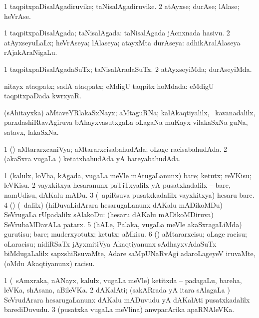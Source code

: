 \bentry
{}
\gl{\nA}
\bmng
\bnum
\num{1} taqpitxpaDisalAgadiruvike; taNisalAgadiruvike. 
\num{2} atAyxse; durAse; lAlase; heVrAse. 
\enum
\emng
\eentry

\bentry
{}
\gl{\gu}
\bmng
\bnum
\num{1} taqpitxpaDisalAgada; taNisalAgada:  taNisalAgada jAcnxnada hasivu. 
\num{2} atAyxseyuLaLx; heVrAseya; lAlaseya; atayxMta durAseya:  adhikAralAlaseya rAjakAraNigaLu. 
\enum
\emng
\eentry

\bentry
{}
\gl{\kirxvi}
\bmng
\bnum
\num{1} taqpitxpaDisalAgadaSuTx; taNisalAradaSuTx. 
\num{2} atAyxseyiMda; durAseyiMda. 
\enum
\emng
\eentry

\bentry
{}
\gl{\gu}
\bmng
nitayx ataqpatx; sadA ataqpatx; eMdigU taqpitx hoMdada:  eMdigU taqpitxpaDada kwrxyaR. 
\emng
\eentry

\bentry
{}
\gl{\nA}
\bmng
(sAhitayxka) aMtaveYRlakaSxNayx; aMtaguRNa; kalAkaqtiyalilx, \kanmu\ kavanadalilx, parxdashiRtavAgiruva bAhayxvasutxgaLa oLagaNa muKayx vilakaSxNa guNa, satavx, lakaSxNa. 
\emng
\eentry

\bentry
{}
\gl{\gu}
\bmng
\bnum
\num{1} (\jAyx) aMtararxcaniVya; aMtararxcisabahudAda; oLage racisabahudAda. 
\num{2} (akaSxra \mo vugaLa \vi) ketatxbahudAda yA bareyabahudAda. 
\enum
\emng
\eentry

\bentry
{}
\gl{\sakirx}
\bmng
\bnum
\num{1} (kalulx, loVha, kAgada, \mo vugaLa meVle mAtugaLanunx) bare; ketutx; reVKisu; leVKisu. 
\num{2} vayxkitxya hesaranunx paTiTxyalilx yA pusatxkadalilx -- bare, namUdisu, dAKalu mADu. 
\num{3} (\kanmu\ apiRsuva pusatxkadalilx vayxkitxya) hesaru bare. 
\num{4} (\birx) (\kanmu\ \BUkaq dalilx) (hiDuvaLidArara hesarugaLanunx dAKalu mADikoMDu) SeVrugaLa rUpadalilx sAlakoDu:  (hesaru dAKalu mADikoMDiruva) SeVrubaMDavALa patarx. 
\num{5} (hALe, Palaka, \mo vugaLa meVle akaSxragaLiMda) gurutisu; bare; muderxyotutx; ketutx; aMkisu. 
\num{6} (\jAyx) aMtararxcisu; oLage racisu; oLaracisu; nidiRSaTx jAyxmitiVya Akaqtiyanunx sAdhayxvAdaSuTx biMdugaLalilx sapxshiRsuvaMte, Adare saMpUNaRvAgi adaroLageyeV iruvaMte, (oMdu Akaqtiyanunx) racisu. 
\enum
\emng
\eentry

\bentry
{}
\gl{\nA}
\bmng
\bnum
\num{1} (\kanmu\ sAmxraka, nANayx, kalulx, \mo vugaLa meVle) ketitxda -- padagaLu, bareha, leVKa, shAsana, aBileVKa. 
\num{2} dAKalAti; (sakARrada yA itara sAlagaLa \vi) SeVrudArara hesarugaLanunx dAKalu mADuvudu yA dAKalAti pusatxkadalilx barediDuvudu. 
\num{3} (pusatxka \mo vugaLa meVlina) anwpacArika apaRNAleVKa. 
\enum
\emng
\eentry

